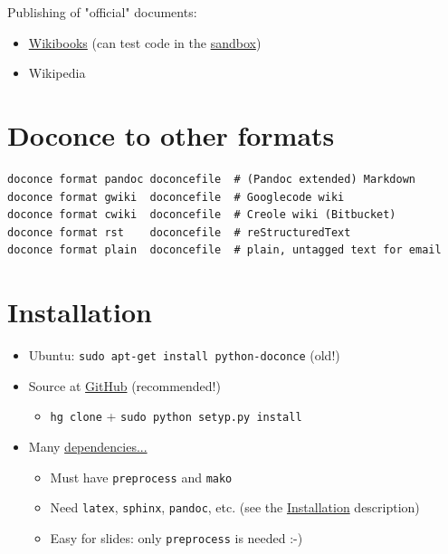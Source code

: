 \documentclass[%
twoside,                 %
final,                   %
chapterprefix=true,      %
open=right               %
10pt]{book}
\newcounter{doconce:movie:counter}
\newcounter{doconce:exercise:counter}
\begin{document}
\noindent
Publishing of "official" documents:

\begin{itemize}
 \item \href{{http://en.wikibooks.org/wiki/Wikibooks:WIW}}{Wikibooks}
   (can test code in the \href{{http://en.wikibooks.org/wiki/Wikibooks:Sandbox}}{sandbox})

 \item Wikipedia
\end{itemize}

\noindent
\section*{Doconce to other formats}

\begin{Verbatim}[numbers=none,fontsize=\fontsize{9pt}{9pt},baselinestretch=0.95]
doconce format pandoc doconcefile  # (Pandoc extended) Markdown
doconce format gwiki  doconcefile  # Googlecode wiki
doconce format cwiki  doconcefile  # Creole wiki (Bitbucket)
doconce format rst    doconcefile  # reStructuredText
doconce format plain  doconcefile  # plain, untagged text for email
\end{Verbatim}

\section*{Installation}

\begin{itemize}
 \item Ubuntu: \Verb!sudo apt-get install python-doconce! (old!)

 \item Source at \href{{https://github.com/hplgit/doconce}}{GitHub} (recommended!)
\begin{itemize}

   \item \Verb!hg clone! + \Verb!sudo python setyp.py install!

\end{itemize}

\noindent
 \item Many \href{{http://hplgit.github.io/doconce/doc/pub/manual/html/manual.html#installation-of-doconce-and-its-dependencies}}{dependencies...}
\begin{itemize}

   \item Must have \Verb!preprocess! and \Verb!mako!

   \item Need \Verb!latex!, \Verb!sphinx!, \Verb!pandoc!, etc. (see the \href{{http://hplgit.github.io/doconce/doc/pub/manual/html/manual.html#installation-of-doconce-and-its-dependencies}}{Installation} description)

   \item Easy for slides: only \Verb!preprocess! is needed :-)
\end{itemize}

\noindent
\end{itemize}
\end{document}
